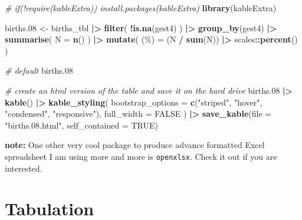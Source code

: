 \documentclass[
]{book}
\newenvironment{Shaded}{\begin{snugshade}}{\end{snugshade}}
\newcommand{\AttributeTok}[1]{\textcolor[rgb]{0.13,0.29,0.53}{#1}}
\newcommand{\CommentTok}[1]{\textcolor[rgb]{0.56,0.35,0.01}{\textit{#1}}}
\newcommand{\ConstantTok}[1]{\textcolor[rgb]{0.56,0.35,0.01}{#1}}
\newcommand{\FloatTok}[1]{\textcolor[rgb]{0.00,0.00,0.81}{#1}}
\newcommand{\FunctionTok}[1]{\textcolor[rgb]{0.13,0.29,0.53}{\textbf{#1}}}
\newcommand{\NormalTok}[1]{#1}
\newcommand{\OtherTok}[1]{\textcolor[rgb]{0.56,0.35,0.01}{#1}}
\newcommand{\SpecialCharTok}[1]{\textcolor[rgb]{0.81,0.36,0.00}{\textbf{#1}}}
\newcommand{\StringTok}[1]{\textcolor[rgb]{0.31,0.60,0.02}{#1}}
\begin{document}
\begin{Shaded}
\begin{Highlighting}[]
\CommentTok{\# if(!require(kableExtra)) install.packages(\textquotesingle{}kableExtra\textquotesingle{})}
\FunctionTok{library}\NormalTok{(kableExtra)}

\NormalTok{births}\FloatTok{.08} \OtherTok{\textless{}{-}}
\NormalTok{  births\_tbl }\SpecialCharTok{|\textgreater{}}
  \FunctionTok{filter}\NormalTok{(}
    \SpecialCharTok{!}\FunctionTok{is.na}\NormalTok{(gest4)}
\NormalTok{  ) }\SpecialCharTok{|\textgreater{}}
  \FunctionTok{group\_by}\NormalTok{(gest4) }\SpecialCharTok{|\textgreater{}}
  \FunctionTok{summarise}\NormalTok{(}
    \AttributeTok{N =} \FunctionTok{n}\NormalTok{()}
\NormalTok{  ) }\SpecialCharTok{|\textgreater{}}
  \FunctionTok{mutate}\NormalTok{(}
    \StringTok{\textasciigrave{}}\AttributeTok{(\%)}\StringTok{\textasciigrave{}} \OtherTok{=}\NormalTok{ (N }\SpecialCharTok{/} \FunctionTok{sum}\NormalTok{(N)) }\SpecialCharTok{|\textgreater{}}\NormalTok{ scales}\SpecialCharTok{::}\FunctionTok{percent}\NormalTok{()}
\NormalTok{  )}

\CommentTok{\# default}
\NormalTok{births}\FloatTok{.08}

\CommentTok{\# create an html version of the table and save it on the hard drive}
\NormalTok{births}\FloatTok{.08} \SpecialCharTok{|\textgreater{}}
  \FunctionTok{kable}\NormalTok{() }\SpecialCharTok{|\textgreater{}}
  \FunctionTok{kable\_styling}\NormalTok{(}
    \AttributeTok{bootstrap\_options =} 
      \FunctionTok{c}\NormalTok{(}\StringTok{"striped"}\NormalTok{, }\StringTok{"hover"}\NormalTok{, }\StringTok{"condensed"}\NormalTok{, }\StringTok{"responsive"}\NormalTok{),}
    \AttributeTok{full\_width =} \ConstantTok{FALSE}
\NormalTok{  ) }\SpecialCharTok{|\textgreater{}}
  \FunctionTok{save\_kable}\NormalTok{(}\AttributeTok{file =} \StringTok{"births.08.html"}\NormalTok{, }\AttributeTok{self\_contained =} \ConstantTok{TRUE}\NormalTok{)}
\end{Highlighting}
\end{Shaded}

\textbf{note:} One other very cool package to produce advance formatted Excel spreadsheet I am using more and more is \texttt{openxlsx}. Check it out if you are interested.

\chapter{Tabulation}\label{tabulation}
\end{document}
